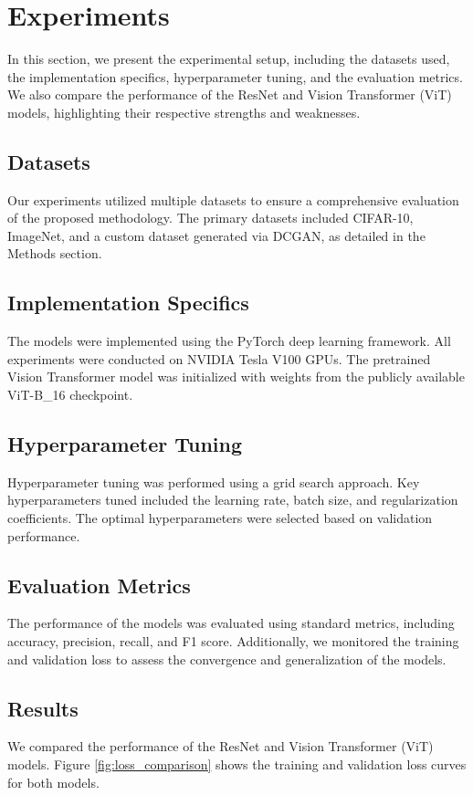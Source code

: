 \section{Experiments}
\label{sec:experiments}

In this section, we present the experimental setup, including the datasets used, the implementation specifics, hyperparameter tuning, and the evaluation metrics. We also compare the performance of the ResNet and Vision Transformer (ViT) models, highlighting their respective strengths and weaknesses.

\subsection{Datasets}
Our experiments utilized multiple datasets to ensure a comprehensive evaluation of the proposed methodology. The primary datasets included CIFAR-10, ImageNet, and a custom dataset generated via DCGAN, as detailed in the Methods section.

\subsection{Implementation Specifics}
The models were implemented using the PyTorch deep learning framework. All experiments were conducted on NVIDIA Tesla V100 GPUs. The pretrained Vision Transformer model was initialized with weights from the publicly available ViT-B\_16 checkpoint.

\subsection{Hyperparameter Tuning}
Hyperparameter tuning was performed using a grid search approach. Key hyperparameters tuned included the learning rate, batch size, and regularization coefficients. The optimal hyperparameters were selected based on validation performance.

\subsection{Evaluation Metrics}
The performance of the models was evaluated using standard metrics, including accuracy, precision, recall, and F1 score. Additionally, we monitored the training and validation loss to assess the convergence and generalization of the models.

\subsection{Results}
We compared the performance of the ResNet and Vision Transformer (ViT) models. Figure \ref{fig:loss_comparison} shows the training and validation loss curves for both models.

